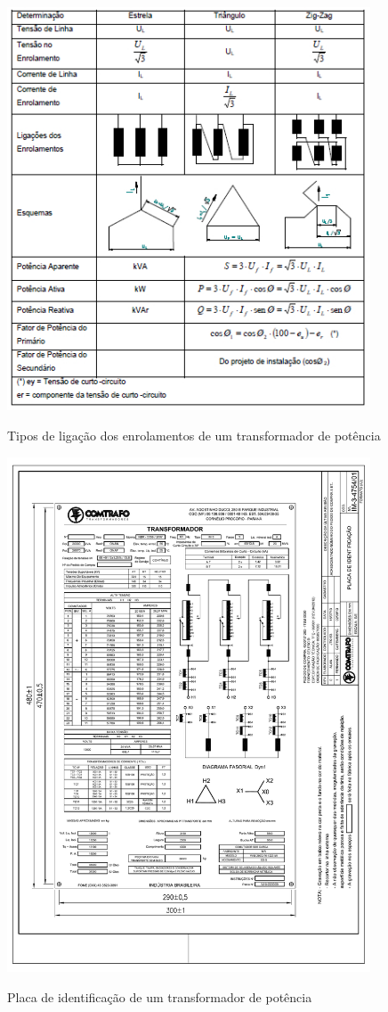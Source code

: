 \documentclass[a5paper,english,spanish,brazil]{ufsc-thesis}
\begin{document}
		\begin{figure}[htb]
		  \caption{Tipos de ligação dos enrolamentos de um transformador de potência}
		  \centering
		  \includegraphics[width=10.8cm]{tiposdenrol.jpg}
		  \label{fig:tiposdenrol}
		\end{figure}

		\begin{figure}[htb]
		  \caption{Placa de identificação de um transformador de potência}
		  \centering
		  \includegraphics[width=10.8cm]{placatrafo.pdf}
		  \label{fig:placatrafo}
		\end{figure}
\end{document}
